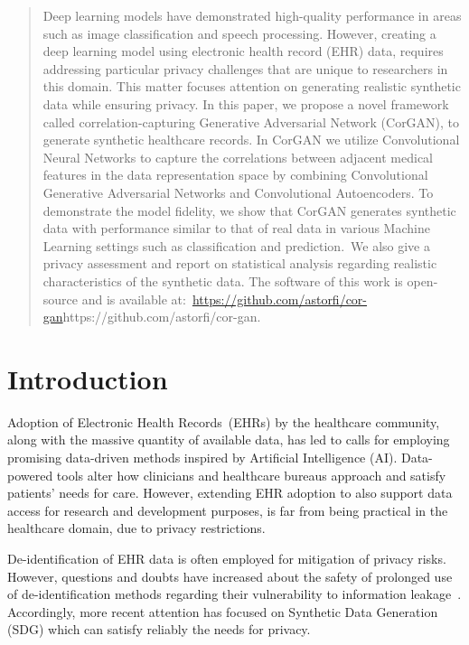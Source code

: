 \documentclass[letterpaper]{article} \usepackage{aaai20}  \usepackage{times}  \usepackage{helvet} \usepackage{courier}  \usepackage[hyphens]{url}  \usepackage{graphicx} \urlstyle{rm} \def\UrlFont{\rm}  \usepackage{graphicx}  \frenchspacing  \setlength{\pdfpagewidth}{8.5in}  \setlength{\pdfpageheight}{11in}
\author{\LARGE \textbf{Amirsina Torfi, Edward A.~Fox}\\ \\ \Large \textbf{Virginia Polytechnic Institute and State University~(Virginia Tech)}\\ 
Department of Computer Science\\
Blacksburg, Virginia 24061\\
\{atorfi,fox\}@vt.edu }
\begin{document}
\maketitle

\begin{abstract}
Deep learning models have demonstrated high-quality performance in areas such as image classification and speech processing.
However, creating a deep learning model using electronic health record (EHR) data, requires addressing particular privacy challenges that are unique to researchers in this domain.
This matter focuses attention on generating realistic synthetic data while ensuring privacy.
In this paper, we propose a novel framework called correlation-capturing Generative Adversarial Network (CorGAN), to generate synthetic healthcare records.
In CorGAN we utilize Convolutional Neural Networks to capture the correlations between adjacent medical features in the data representation space by combining Convolutional Generative Adversarial Networks and Convolutional Autoencoders.
To demonstrate the model fidelity, we show that CorGAN generates synthetic data with performance similar to that of real data in various Machine Learning settings such as classification and prediction.~We also give a privacy assessment and report on statistical analysis regarding realistic characteristics of the synthetic data. The software of this work is open-source and is available at:~\url{https://github.com/astorfi/cor-gan}{https://github.com/astorfi/cor-gan}.
\end{abstract}

\section{Introduction}

Adoption of Electronic Health Records~(EHRs) by the healthcare community, along with the massive quantity of available data, has led to calls for employing promising data-driven methods inspired by Artificial Intelligence (AI).
Data-powered tools alter how clinicians and healthcare bureaus approach and satisfy patients' needs for care.
However, extending EHR adoption to also support data access for research and development purposes, is far from being practical in the healthcare domain, due to privacy restrictions.

De-identification of EHR data is often employed for mitigation of privacy risks.
However, questions and doubts have increased about the safety of prolonged use of de-identification methods regarding their vulnerability to information leakage~\cite{el2011re}. Accordingly, more recent attention has focused on Synthetic Data Generation (SDG) which can satisfy reliably the needs for privacy.
\end{document}
